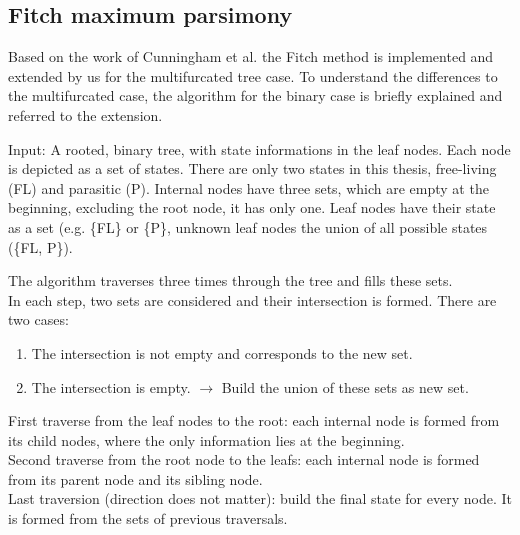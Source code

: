     \subsection{Fitch maximum parsimony}
      Based on the work of Cunningham et al. \cite{Cunningham1998} the Fitch method \cite{Fitch1971} 
        is implemented and extended by us for the multifurcated tree case. To understand the 
        differences to the multifurcated case, the algorithm for the binary case is briefly explained 
        and referred to the extension.

      Input: A rooted, binary tree, with state informations in the leaf nodes. Each node is depicted as 
        a set of states. There are only two states in this thesis, free-living (FL) and parasitic (P). 
        Internal nodes have three sets, which are empty at the beginning, excluding the root node, it 
        has only one. Leaf nodes have their state as a set (e.g. \{FL\} or \{P\}, unknown leaf nodes the 
        union of all possible states (\{FL, P\}).

      The algorithm traverses three times through the tree and fills these sets. \\
      In each step, two sets are considered and their intersection is formed. There are two cases:
      \begin{enumerate}
        \item The intersection is not empty and corresponds to the new set.
        \item The intersection is empty. $\rightarrow$ Build the union of these sets as new set.
      \end{enumerate}
      First traverse from the leaf nodes to the root: each internal node is formed from its child nodes, 
        where the only information lies at the beginning. \\
      Second traverse from the root node to the leafs: each internal node is formed from its parent node 
        and its sibling node. \\
      Last traversion (direction does not matter): build the final state for every node. It is formed 
        from the sets of previous traversals.

